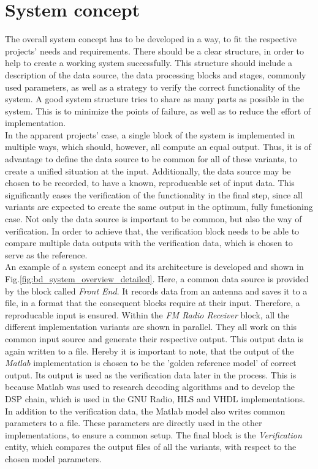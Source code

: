 \section{System concept}

The overall system concept has to be developed in a way, to fit the respective projects' needs and requirements.
There should be a clear structure, in order to help to create a working system successfully.
This structure should include a description of the data source, the data processing blocks and stages, commonly used parameters, as well as a strategy to verify the correct functionality of the system.
A good system structure tries to share as many parts as possible in the system.
This is to minimize the points of failure, as well as to reduce the effort of implementation.\\

In the apparent projects' case, a single block of the system is implemented in multiple ways, which should, however, all compute an equal output.
Thus, it is of advantage to define the data source to be common for all of these variants, to create a unified situation at the input.
Additionally, the data source may be chosen to be recorded, to have a known, reproducable set of input data.
This significantly eases the verification of the functionality in the final step, since all variants are expected to create the same output in the optimum, fully functioning case.
Not only the data source is important to be common, but also the way of verification.
In order to achieve that, the verification block needs to be able to compare multiple data outputs with the verification data, which is chosen to serve as the reference.\\

An example of a system concept and its architecture is developed and shown in Fig.\ref{fig:bd_system_overview_detailed}.
Here, a common data source is provided by the block called \textit{Front End}.
It records data from an antenna and saves it to a file, in a format that the consequent blocks require at their input.
Therefore, a reproducable input is ensured.
Within the \textit{FM Radio Receiver} block, all the different implementation variants are shown in parallel.
They all work on this common input source and generate their respective output.
This output data is again written to a file.
Hereby it is important to note, that the output of the \textit{Matlab} implementation is chosen to be the 'golden reference model' of correct output.
Its output is used as the verification data later in the process.
This is because Matlab was used to research decoding algorithms and to develop the DSP chain, which is used in the GNU Radio, HLS and VHDL implementations.
In addition to the verification data, the Matlab model also writes common parameters to a file.
These parameters are directly used in the other implementations, to ensure a common setup.
The final block is the \textit{Verification} entity, which compares the output files of all the variants, with respect to the chosen model parameters.\\

